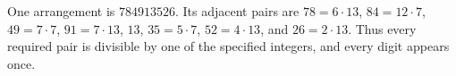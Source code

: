 One arrangement is $\boxed{784913526}$. Its adjacent pairs are $78=6\cdot13$, $84=12\cdot7$, $49=7\cdot7$, $91=7\cdot13$, $13$, $35=5\cdot7$, $52=4\cdot13$, and $26=2\cdot13$. Thus every required pair is divisible by one of the specified integers, and every digit appears once.
